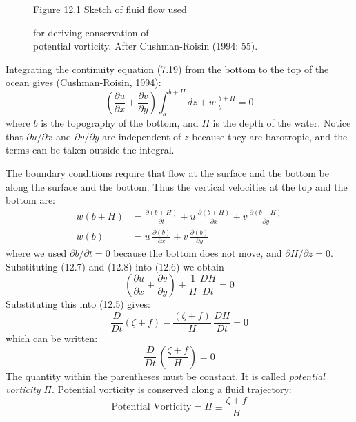 \begin{figure}[t!]
\centering
{}
\footnotesize
Figure 12.1 Sketch of fluid flow used \rule{0mm}{3ex}for deriving
conservation of\\potential vorticity. After Cushman-Roisin (1994: 55).

\label{fig:vorticitysketch}
\vspace{-3ex}
\end{figure}

Integrating the continuity equation (7.19) from the bottom to the top
of the ocean gives (Cushman-Roisin, 1994):
\begin{equation}
\left( \frac{\partial{u}}{\partial{x}} + \frac{\partial{v}}{\partial{y}}\right) \int_{b}^{b+H} dz + w \bigr|_{b}^{b+H} = 0
\end{equation}
where $b$ is the topography of the bottom, and $H$ is the depth of the
water. Notice that $\partial{u}/\partial{x}$ and
$\partial{v}/\partial{y}$ are independent of $z$ because they are
barotropic, and the terms can be taken outside the integral.

The boundary conditions require that flow at the surface and the
bottom be along the surface and the bottom. Thus the vertical
velocities at the top and the bottom are:
\begin{align}
w(b+H) &= \frac{\partial{(b+H)}}{\partial{t}} + u\,\frac{\partial{(b+H)}}{\partial{x}}+v\, \frac{\partial{(b+H)}}{\partial{y}} \\
w(b) &= u\,\frac{\partial{(b)}}{\partial{x}}+v\,\frac{\partial{(b)}}{\partial{y}}
\end{align}
where we used $\partial{b}/\partial{t} = 0$ because the bottom does
not move, and $\partial{H}/\partial{z} = 0$. Substituting (12.7) and (12.8)
into (12.6) we obtain
\begin{displaymath}
\left( \frac{\partial{u}}{\partial{x}} + \frac{\partial{v}}{\partial{y}}\right) + \frac{1}{H}\,\frac{DH}{Dt} = 0
\end{displaymath}
Substituting this into (12.5) gives:
\begin{displaymath}
\frac{D}{Dt}\left(\zeta +f  \right) -\frac{\left(\zeta +f
\right)}{H}\,\frac{DH}{Dt} = 0
\end{displaymath}
which can be written:
\begin{displaymath}
\frac{D }{Dt}\,\left( \frac{\zeta + f}{H} \right) = 0
\end{displaymath}
The quantity within the parentheses must be constant. It is called
\textit{potential vorticity}
$\Pi$. Potential vorticity is conserved along a fluid trajectory:
\begin{equation}
\boxed{\text{Potential Vorticity} = \Pi \equiv \frac{\zeta + f}{H} }
\end{equation}

